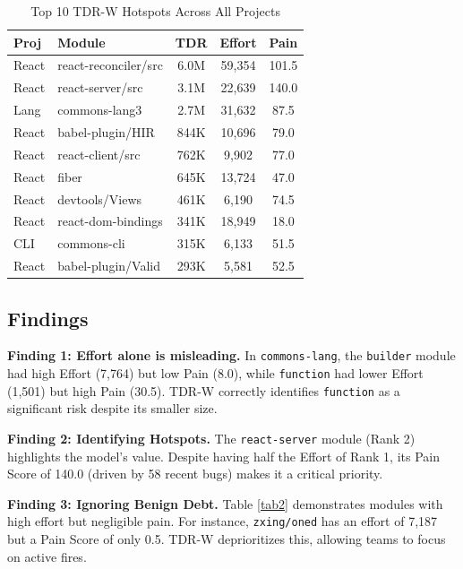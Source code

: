 \documentclass[conference]{IEEEtran}
\begin{document}
\begin{table}[htbp]
\caption{Top 10 TDR-W Hotspots Across All Projects}
\begin{center}
\begin{tabular}{|l|p{2.5cm}|c|c|c|}
\hline
\textbf{Proj} & \textbf{Module} & \textbf{TDR} & \textbf{Effort} & \textbf{Pain} \\
\hline
React & react-reconciler/src & 6.0M & 59,354 & 101.5 \\
React & react-server/src & 3.1M & 22,639 & 140.0 \\
Lang & commons-lang3 & 2.7M & 31,632 & 87.5 \\
React & babel-plugin/HIR & 844K & 10,696 & 79.0 \\
React & react-client/src & 762K & 9,902 & 77.0 \\
React & fiber & 645K & 13,724 & 47.0 \\
React & devtools/Views & 461K & 6,190 & 74.5 \\
React & react-dom-bindings & 341K & 18,949 & 18.0 \\
CLI & commons-cli & 315K & 6,133 & 51.5 \\
React & babel-plugin/Valid & 293K & 5,581 & 52.5 \\
\hline
\end{tabular}
\label{tab1}
\end{center}
\end{table}

\subsection{Findings}
\textbf{Finding 1: Effort alone is misleading.}
In \texttt{commons-lang}, the \texttt{builder} module had high Effort (7,764) but low Pain (8.0), while \texttt{function} had lower Effort (1,501) but high Pain (30.5). TDR-W correctly identifies \texttt{function} as a significant risk despite its smaller size.

\textbf{Finding 2: Identifying Hotspots.}
The \texttt{react-server} module (Rank 2) highlights the model's value. Despite having half the Effort of Rank 1, its Pain Score of 140.0 (driven by 58 recent bugs) makes it a critical priority.

\textbf{Finding 3: Ignoring Benign Debt.}
Table \ref{tab2} demonstrates modules with high effort but negligible pain. For instance, \texttt{zxing/oned} has an effort of 7,187 but a Pain Score of only 0.5. TDR-W deprioritizes this, allowing teams to focus on active fires.
\end{document}
